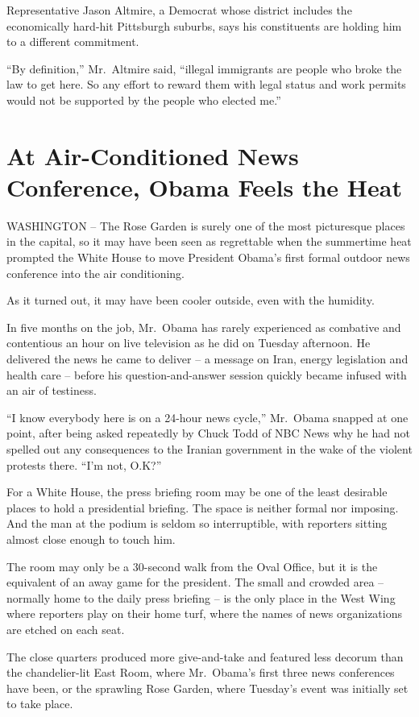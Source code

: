 ﻿\documentclass[12pt]{article}
\begin{document}
Representative Jason Altmire, a Democrat whose district includes the economically hard-hit
Pittsburgh suburbs, says his constituents are holding him to a different commitment.

``By definition,'' Mr.~Altmire said, ``illegal immigrants are people who broke the law to get here.
So any effort to reward them with legal status and work permits would not be supported by the people
who elected me.''

\section{At Air-Conditioned News Conference, Obama Feels the Heat}

WASHINGTON -- The Rose Garden is surely one of the most picturesque places in the capital, so it may
have been seen as regrettable when the summertime heat prompted the White House to move President
Obama's first formal outdoor news conference into the air conditioning.

As it turned out, it may have been cooler outside, even with the humidity.

In five months on the job, Mr.~Obama has rarely experienced as combative and contentious an hour on
live television as he did on Tuesday afternoon. He delivered the news he came to deliver -- a
message on Iran, energy legislation and health care -- before his question-and-answer session
quickly became infused with an air of testiness.

``I know everybody here is on a 24-hour news cycle,'' Mr.~Obama snapped at one point, after being
asked repeatedly by Chuck Todd of NBC News why he had not spelled out any consequences to the
Iranian government in the wake of the violent protests there. ``I'm not, O.K?''

For a White House, the press briefing room may be one of the least desirable places to hold a
presidential briefing. The space is neither formal nor imposing. And the man at the podium is seldom
so interruptible, with reporters sitting almost close enough to touch him.

The room may only be a 30-second walk from the Oval Office, but it is the equivalent of an away game
for the president. The small and crowded area -- normally home to the daily press briefing -- is the
only place in the West Wing where reporters play on their home turf, where the names of news
organizations are etched on each seat.

The close quarters produced more give-and-take and featured less decorum than the chandelier-lit
East Room, where Mr.~Obama's first three news conferences have been, or the sprawling Rose Garden,
where Tuesday's event was initially set to take place.
\end{document}
